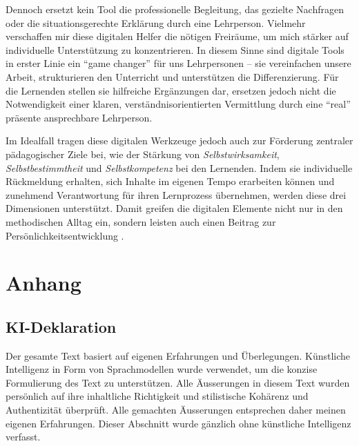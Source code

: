 Dennoch ersetzt kein Tool die professionelle Begleitung, das gezielte Nachfragen oder die situationsgerechte Erklärung durch eine Lehrperson. Vielmehr verschaffen mir diese digitalen Helfer die nötigen Freiräume, um mich stärker auf individuelle Unterstützung zu konzentrieren. In diesem Sinne sind digitale Tools in erster Linie ein \enquote{game changer} für uns Lehrpersonen – sie vereinfachen unsere Arbeit, strukturieren den Unterricht und unterstützen die Differenzierung. Für die Lernenden stellen sie hilfreiche Ergänzungen dar, ersetzen jedoch nicht die Notwendigkeit einer klaren, verständnisorientierten Vermittlung durch eine \enquote{real} präsente ansprechbare Lehrperson.

Im Idealfall tragen diese digitalen Werkzeuge jedoch auch zur Förderung zentraler pädagogischer Ziele bei, wie der Stärkung von \emph{Selbstwirksamkeit}, \emph{Selbstbestimmtheit} und \emph{Selbstkompetenz} bei den Lernenden. Indem sie individuelle Rückmeldung erhalten, sich Inhalte im eigenen Tempo erarbeiten können und zunehmend Verantwortung für ihren Lernprozess übernehmen, werden diese drei Dimensionen unterstützt. Damit greifen die digitalen Elemente nicht nur in den methodischen Alltag ein, sondern leisten auch einen Beitrag zur Persönlichkeitsentwicklung \cite{alma991170251641605501}.



\appendix
\section{Anhang}
\subsection{KI-Deklaration}

Der gesamte Text basiert auf eigenen Erfahrungen und Überlegungen. Künstliche Intelligenz in Form von Sprachmodellen wurde verwendet, um die konzise Formulierung des Text zu unterstützen. Alle Äusserungen in diesem Text wurden persönlich auf ihre inhaltliche Richtigkeit und stilistische Kohärenz und Authentizität überprüft. Alle gemachten Äusserungen entsprechen daher meinen eigenen Erfahrungen. Dieser Abschnitt wurde gänzlich ohne künstliche Intelligenz verfasst.

\printbibliography[heading=bibsubsection]